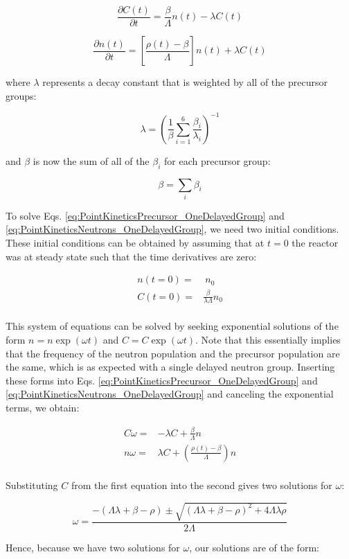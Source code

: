 \documentclass[10pt]{article}
\newcommand{\beq}{\begin{equation}}
\newcommand{\eeq}{\end{equation}}
\newcommand{\beqa}{\begin{equation}\begin{aligned}}
\newcommand{\eeqa}{\end{aligned}\end{equation}}
\begin{document}
\begin{flushleft}
\beq
\label{eq:PointKineticsPrecursor_OneDelayedGroup}
\frac{\partial C(t)}{\partial t}=\frac{\beta}{\Lambda}n(t)-\lambda C(t)
\eeq

\beq
\label{eq:PointKineticsNeutrons_OneDelayedGroup}
\frac{\partial n(t)}{\partial t}=\left\lbrack\frac{\rho(t)-\beta}{\Lambda}\right\rbrack n(t)+\lambda C(t)
\eeq

where \(\lambda\) represents a decay constant that is weighted by all of the precursor groups:

\beq
\label{eq:Lambda_OneGroup}
\lambda=\left(\frac{1}{\beta}\sum_{i=1}^{6}\frac{\beta_i}{\lambda_i}\right)^{-1}
\eeq

and \(\beta\) is now the sum of all of the \(\beta_i\) for each precursor group:

\beq
\beta=\sum_{i}\beta_i
\eeq

To solve Eqs. \ref{eq:PointKineticsPrecursor_OneDelayedGroup} and \ref{eq:PointKineticsNeutrons_OneDelayedGroup}, we need two initial conditions. These initial conditions can be obtained by assuming that at \(t=0\) the reactor was at steady state such that the time derivatives are zero:

\beqa
\label{eq:PKE_OneGroup_ICs}
n(t=0)=&\ n_0\\
C(t=0)=&\frac{\beta}{\lambda\Lambda}n_0\\
\eeqa

This system of equations can be solved by seeking exponential solutions of the form \(n=n\exp(\omega t)\) and \(C=C\exp(\omega t)\). Note that this essentially implies that the frequency of the neutron population and the precursor population are the same, which is as expected with a single delayed neutron group. Inserting these forms into Eqs. \ref{eq:PointKineticsPrecursor_OneDelayedGroup} and \ref{eq:PointKineticsNeutrons_OneDelayedGroup} and canceling the exponential terms, we obtain:

\beqa
\label{eq:PKE_OneGroup_AssumedForm}
C\omega=&-\lambda C+\frac{\beta}{\Lambda}n\\
n\omega=&\lambda C+\left(\frac{\rho(t)-\beta}{\Lambda}\right)n\\
\eeqa

Substituting \(C\) from the first equation into the second gives two solutions for \(\omega\):  

\beq
\label{eq:PKEomega}
\omega=\frac{-(\Lambda\lambda+\beta-\rho)\pm\sqrt{(\Lambda\lambda+\beta-\rho)^2+4\Lambda\lambda\rho}}{2\Lambda}
\eeq

Hence, because we have two solutions for \(\omega\), our solutions are of the form:


\end{flushleft}
\end{document}
